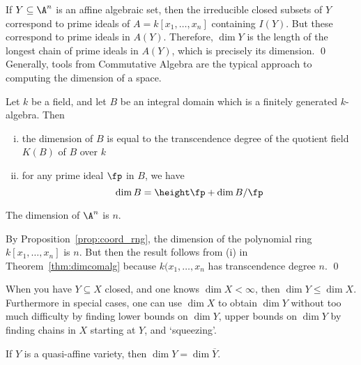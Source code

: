 \pf If $Y \subseteq \A^n$ is an affine algebraic set, then the irreducible closed subsets of $Y$ correspond to prime ideals of $A= k[x_1,\ldots,x_n]$ containing $I(Y)$. But these correspond to prime ideals in $A(Y)$. Therefore, $\dim Y$ is the length of the longest chain of prime ideals in $A(Y)$, which is precisely its dimension. \qed \\


Generally, tools from Commutative Algebra are the typical approach to computing the dimension of a space. 


\begin{thm} \label{thm:dimcomalg}
Let $k$ be a field, and let $B$ be an integral domain which is a finitely generated $k$-algebra. Then
	\begin{enumerate}[(i)]
	\item the dimension of $B$ is equal to the  transcendence degree of the quotient field $K(B)$ of $B$ over $k$
	\item for any prime ideal $\fp$ in $B$, we have
		\[
		\dim B= \height \fp + \dim B/\fp
		\]
	\end{enumerate}
\end{thm}


\begin{prop}
The dimension of $\A^n$ is $n$.
\end{prop}

\pf By Proposition~\ref{prop:coord_rng}, the dimension of the polynomial ring $k[x_1,\ldots,x_n]$ is $n$. But then the result follows from (i) in Theorem~\ref{thm:dimcomalg} because $k(x_1,\ldots,x_n$ has transcendence degree $n$. \qed \\


\begin{rem}
When you have $Y \subseteq X$ closed, and one knows $\dim X < \infty$, then $\dim Y \leq \dim X$. Furthermore in special cases, one can use $\dim X$ to obtain $\dim Y$ without too much difficulty by finding lower bounds on $\dim Y$, upper bounds on $\dim Y$ by finding chains in $X$ starting at $Y$, and `squeezing'. 
\end{rem}


\begin{prop}
If $Y$ is a quasi-affine variety, then $\dim Y= \dim \overline{Y}$.
\end{prop}

